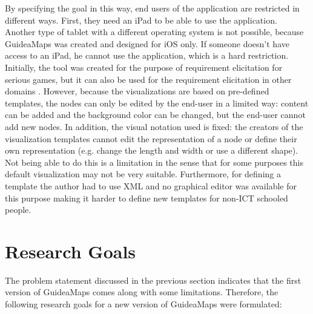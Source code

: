 By specifying the goal in this way, end users of the application are restricted in different ways. First, they need an iPad to be able to use the application. Another type of tablet with a different operating system is not possible, because GuideaMaps was created and designed for iOS only. If someone doesn't have access to an iPad, he cannot use the application, which is a hard restriction. \\

Initially, the tool was created for the purpose of requirement elicitation for serious games, but it can also be used for the requirement elicitation in other domains \citep{detroyerjanssens}. However, because the visualizations are based on pre-defined templates, the nodes can only be edited by the end-user in a limited way: content can be added and the background color can be changed, but the end-user cannot add new nodes. In addition, the visual notation used is fixed: the creators of the visualization templates cannot edit the representation of a node or define their own representation (e.g. change the length and width or use a different shape). Not being able to do this is a limitation in the sense that for some purposes this default visualization may not be very suitable. Furthermore, for defining a template the author had to use XML and no graphical editor was available for this purpose making it harder to define new templates for non-ICT schooled people.

\section{Research Goals}\label{sec:research-goals}
The problem statement discussed in the previous section indicates that the first version of GuideaMaps comes along with some limitations. Therefore, the following research goals for a new version of GuideaMaps were formulated:


